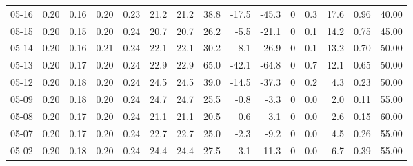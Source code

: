 \begin{threeparttable}
{\begin{tabular}{lrrrrrrrrrrrrrr}
  05-16 &          0.20 &          0.16 &          0.20 &        0.23 &                21.2 &               21.2 &                38.8 &      -17.5 &        -45.3 &              0 &                 0.3 &             17.6 &            0.96 &                  40.00 \\
  05-15 &          0.20 &          0.15 &          0.20 &        0.24 &                20.7 &               20.7 &                26.2 &       -5.5 &        -21.1 &              0 &                 0.1 &             14.2 &            0.75 &                  45.00 \\
  05-14 &          0.20 &          0.16 &          0.21 &        0.24 &                22.1 &               22.1 &                30.2 &       -8.1 &        -26.9 &              0 &                 0.1 &             13.2 &            0.70 &                  50.00 \\
  05-13 &          0.20 &          0.17 &          0.20 &        0.24 &                22.9 &               22.9 &                65.0 &      -42.1 &        -64.8 &              0 &                 0.7 &             12.1 &            0.65 &                  50.00 \\
  05-12 &          0.20 &          0.18 &          0.20 &        0.24 &                24.5 &               24.5 &                39.0 &      -14.5 &        -37.3 &              0 &                 0.2 &              4.3 &            0.23 &                  50.00 \\
  05-09 &          0.20 &          0.18 &          0.20 &        0.24 &                24.7 &               24.7 &                25.5 &       -0.8 &         -3.3 &              0 &                 0.0 &              2.0 &            0.11 &                  55.00 \\
  05-08 &          0.20 &          0.17 &          0.20 &        0.24 &                21.1 &               21.1 &                20.5 &        0.6 &          3.1 &              0 &                 0.0 &              2.6 &            0.15 &                  60.00 \\
  05-07 &          0.20 &          0.17 &          0.20 &        0.24 &                22.7 &               22.7 &                25.0 &       -2.3 &         -9.2 &              0 &                 0.0 &              4.5 &            0.26 &                  55.00 \\
  05-02 &          0.20 &          0.18 &          0.20 &        0.24 &                24.4 &               24.4 &                27.5 &       -3.1 &        -11.3 &              0 &                 0.0 &              6.7 &            0.39 &                  55.00 \\

\end{tabular}}
\end{threeparttable}
